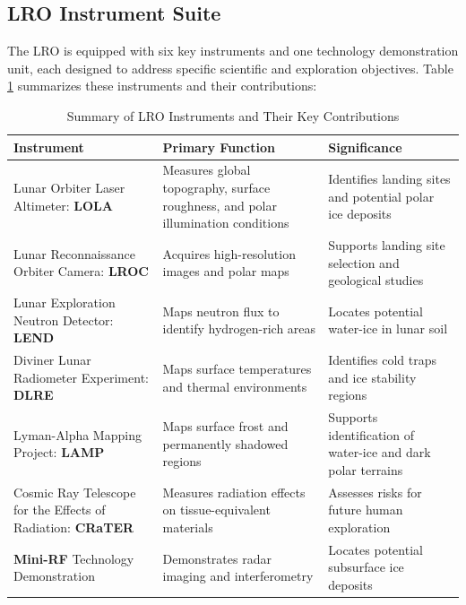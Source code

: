 \subsection*{LRO Instrument Suite}
The LRO is equipped with six key instruments and one technology demonstration unit, each designed to address specific scientific and exploration objectives. Table \ref{tab:lro_instruments} summarizes these instruments and their contributions:

\begin{table}[h!]
    \centering
    \caption{Summary of LRO Instruments and Their Key Contributions \cite{lro}}
    \label{tab:lro_instruments}
    \begin{tabular}{|p{3.5cm}|p{5cm}|p{4.5cm}|}
        \hline
        \textbf{Instrument} & \textbf{Primary Function} & \textbf{Significance} \\
        \hline \hline
        Lunar Orbiter Laser Altimeter: \textbf{LOLA} & Measures global topography, surface roughness, and polar illumination conditions & Identifies landing sites and potential polar ice deposits \\
        \hline
        Lunar Reconnaissance Orbiter Camera: \textbf{LROC} & Acquires high-resolution images and polar maps & Supports landing site selection and geological studies \\
        \hline
        Lunar Exploration Neutron Detector: \textbf{LEND} & Maps neutron flux to identify hydrogen-rich areas & Locates potential water-ice in lunar soil \\
        \hline
        Diviner Lunar Radiometer Experiment: \textbf{DLRE} & Maps surface temperatures and thermal environments & Identifies cold traps and ice stability regions \\
        \hline
        Lyman-Alpha Mapping Project: \textbf{LAMP} & Maps surface frost and permanently shadowed regions & Supports identification of water-ice and dark polar terrains \\
        \hline
        Cosmic Ray Telescope for the Effects of Radiation: \textbf{CRaTER} & Measures radiation effects on tissue-equivalent materials & Assesses risks for future human exploration \\
        \hline
        \textbf{Mini-RF} Technology Demonstration & Demonstrates radar imaging and interferometry & Locates potential subsurface ice deposits \\
        \hline
    \end{tabular}
\end{table}



